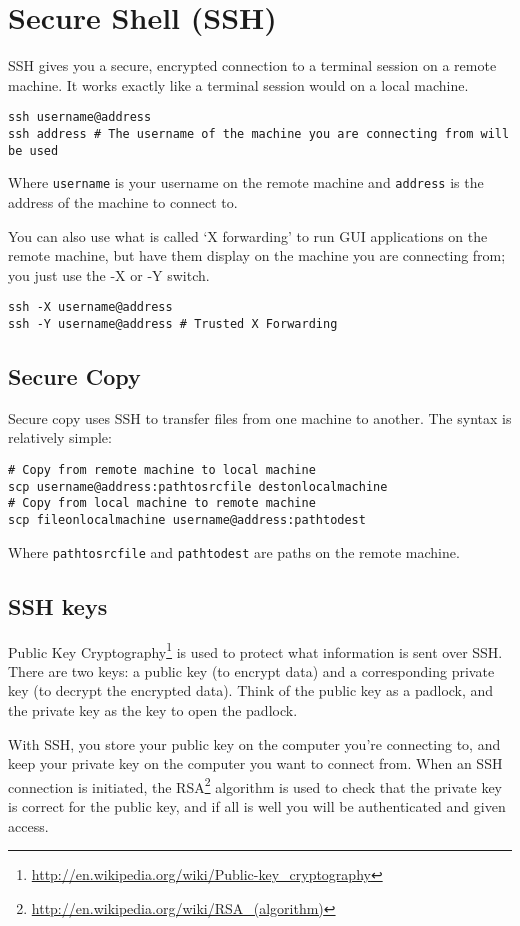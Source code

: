 \documentclass{article}
\begin{document}
\section{Secure Shell (SSH)}
SSH gives you a secure, encrypted connection to a terminal session on a remote machine. It works exactly like a terminal session would on a local machine. 
\begin{verbatim}
ssh username@address
ssh address # The username of the machine you are connecting from will be used
\end{verbatim}
Where \texttt{username} is your username on the remote machine and \texttt{address} is the address of the machine to connect to. 

You can also use what is called `X forwarding' to run GUI applications on the remote machine, but have them display on the machine you are connecting from; you just use the -X or -Y switch.
\begin{verbatim}
ssh -X username@address
ssh -Y username@address # Trusted X Forwarding
\end{verbatim}
\subsection{Secure Copy}
Secure copy uses SSH to transfer files from one machine to another. The syntax is relatively simple:
\begin{verbatim}
# Copy from remote machine to local machine
scp username@address:pathtosrcfile destonlocalmachine
# Copy from local machine to remote machine
scp fileonlocalmachine username@address:pathtodest
\end{verbatim}
Where \texttt{pathtosrcfile} and \texttt{pathtodest} are paths on the remote machine.

\subsection{SSH keys}
Public Key Cryptography\footnote{\url{http://en.wikipedia.org/wiki/Public-key_cryptography}} is used to protect what information is sent over SSH. There are two keys: a public key (to encrypt data) and a corresponding private key (to decrypt the encrypted data). Think of the public key as a padlock, and the private key as the key to open the padlock. 

With SSH, you store your public key on the computer you're connecting to, and keep your private key on the computer you want to connect from. When an SSH connection is initiated, the RSA\footnote{\url{http://en.wikipedia.org/wiki/RSA_(algorithm)}} algorithm is used to check that the private key is correct for the public key, and if all is well you will be authenticated and given access.
\end{document}
